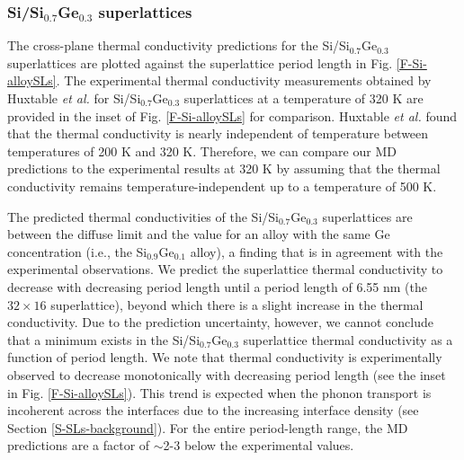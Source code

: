 \documentclass[letterpaper,12pt]{article}
\begin{document}
\subsubsection*{Si/Si$_{0.7}$Ge$_{0.3}$ superlattices}


The cross-plane thermal conductivity predictions for the
Si/Si$_{0.7}$Ge$_{0.3}$ superlattices are plotted against the
superlattice period length in Fig$.$ \ref{F-Si-alloySLs}. The
experimental thermal conductivity measurements obtained by Huxtable
\textit{et al.} \cite{huxtablethesis} for Si/Si$_{0.7}$Ge$_{0.3}$
superlattices at a temperature of 320 K are provided in the inset of
Fig$.$ \ref{F-Si-alloySLs} for comparison. Huxtable \textit{et al.}
found that the thermal conductivity is nearly independent of
temperature between temperatures of 200 K and 320 K. Therefore, we
can compare our MD predictions to the experimental results at 320 K
by assuming that the thermal conductivity remains
temperature-independent up to a temperature of 500 K.

The predicted thermal conductivities of the Si/Si$_{0.7}$Ge$_{0.3}$
superlattices are between the diffuse limit and the value for an
alloy with the same Ge concentration (i.e., the Si$_{0.9}$Ge$_{0.1}$
alloy), a finding that is in agreement with the experimental
observations. We predict the superlattice thermal conductivity to
decrease with decreasing period length until a period length of 6.55
nm (the $32\times16$ superlattice), beyond which there is a slight
increase in the thermal conductivity. Due to the prediction
uncertainty, however, we cannot conclude that a minimum exists in
the Si/Si$_{0.7}$Ge$_{0.3}$ superlattice thermal conductivity as a
function of period length. We note that thermal conductivity is
experimentally observed to decrease monotonically with decreasing
period length (see the inset in Fig$.$ \ref{F-Si-alloySLs}). This
trend is expected when the phonon transport is incoherent across the
interfaces due to the increasing interface density (see Section
\ref{S-SLs-background}). For the entire period-length range, the MD
predictions are a factor of $\sim$2-3 below the experimental values.
\end{document}
